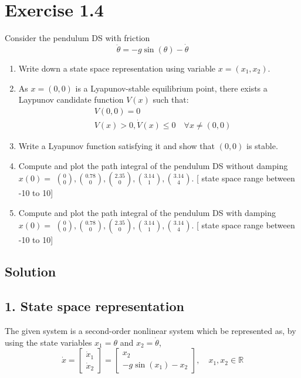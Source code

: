 \section*{Exercise 1.4}

Consider the pendulum DS with friction
\[
    \ddot{\theta}=-g \sin (\theta)-\dot{\theta}
\]
\begin{enumerate}[noitemsep]
    \item Write down a state space representation using variable \( x=\left(x_{1}, x_{2}\right) \).
    \item As \( x=(0,0) \) is a Lyapunov-stable equilibrium point, there exists a Laypunov candidate function \( V(x) \) such that:
          \begin{align*}
               & V(0,0)=0                                            \\
               & V(x)>0, \dot{V}(x) \leq 0 \quad \forall x \neq(0,0)
          \end{align*}
    \item Write a Lyapunov function satisfying it and show that \( (0,0) \) is stable.
    \item Compute and plot the path integral of the pendulum DS without damping \( x(0)= \) \( \binom{0}{0},\binom{0.78}{0},\binom{2.35}{0},\binom{3.14}{1},\binom{3.14}{4} \).
              [ state space range between -10 to 10]
    \item Compute and plot the path integral of the pendulum DS with damping \\
          \( x(0)= \) \( \binom{0}{0},\binom{0.78}{0},\binom{2.35}{0},\binom{3.14}{1},\binom{3.14}{4} \).
              [ state space range between -10 to 10]
\end{enumerate}

\subsection*{Solution}

\subsection*{1. State space representation}

The given system is a second-order nonlinear system which be represented as, by using the state variables \( x_{1} = \theta \) and \( x_{2} = \dot{\theta} \),
\[
    \dot x
    =
    \boxed{
        \begin{bmatrix}
            \dot{x}_{1} \\
            \dot{x}_{2}
        \end{bmatrix}
        =
        \begin{bmatrix}
            x_{2} \\
            -g \sin (x_{1}) - x_{2}
        \end{bmatrix}
        ,\quad x_{1}, x_{2} \in \mathbb{R}
    }
\]

